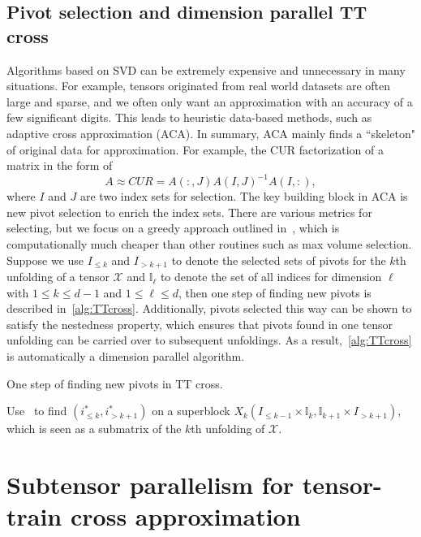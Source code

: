 \documentclass[11pt,a4paper,review]{siamart220329}
\begin{document}
\subsection{Pivot selection and dimension parallel TT cross}
Algorithms based on SVD can be extremely expensive and unnecessary in many situations. For example, tensors originated from real world datasets are often large and sparse, and we often only want an approximation with an accuracy of a few significant digits. This leads to heuristic data-based methods, such as adaptive cross approximation (ACA). In summary, ACA mainly finds a ``skeleton" of original data for approximation. For example, the CUR factorization of a matrix in the form of
\[ A \approx CUR = A(:,J)A(I,J)^{-1}A(I,:), \]
where $I$ and $J$ are two index sets for selection. The key building block in ACA is new pivot selection to enrich the index sets. There are various metrics for selecting, but we focus on a greedy approach outlined in~\cite[Algorithm 2]{dolgov2020parallel}, which is computationally much cheaper than other routines such as max volume selection. Suppose we use $I_{\le k}$ and $I_{>k+1}$ to denote the selected sets of pivots for the $k$th unfolding of a tensor $\mathcal{X}$ and $\mathbb{I}_\ell$ to denote the set of all indices for dimension $\ell$ with $1 \le k \le d-1$ and $1 \le \ell \le d$, then one step of finding new pivots is described in~\cref{alg:TTcross}. Additionally, pivots selected this way can be shown to satisfy the nestedness property, which ensures that pivots found in one tensor unfolding can be carried over to subsequent unfoldings. As a result,~\cref{alg:TTcross} is automatically a dimension parallel algorithm.

\begin{algorithm}
\caption{One step of finding new pivots in TT cross.}
\begin{algorithmic}[1]
\label{alg:TTcross}
\State Use~\cite[Algorithm 2]{dolgov2020parallel} to find $(i^*_{\le k}, i^*_{>k+1})$ on a superblock $X_k(I_{\le k-1}\times\mathbb{I}_k,\mathbb{I}_{k+1}\times I_{> k+1})$, which is seen as a submatrix of the $k$th unfolding of $\mathcal{X}$.
\EndFor
\end{algorithmic}
\end{algorithm}

\section{Subtensor parallelism for tensor-train cross approximation}
\label{sec:subTTcross}
\end{document}
